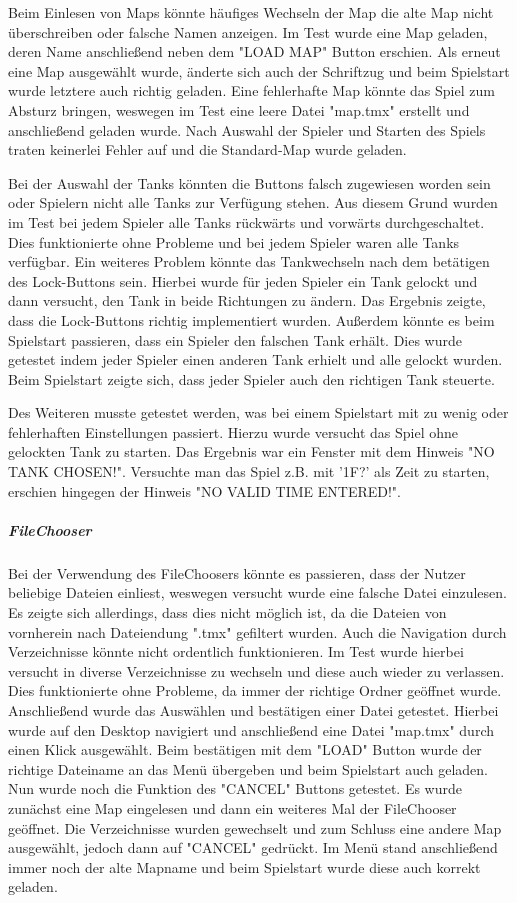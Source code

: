 \documentclass[a4paper]{scrreprt}
\begin{document}
Beim Einlesen von Maps könnte häufiges Wechseln der Map die alte Map nicht überschreiben oder falsche Namen anzeigen. Im Test wurde eine Map geladen, deren Name anschließend neben dem "LOAD MAP" Button erschien. Als erneut eine Map ausgewählt wurde, änderte sich auch der Schriftzug und beim Spielstart wurde letztere auch richtig geladen. Eine fehlerhafte Map könnte das Spiel zum Absturz bringen, weswegen im Test eine leere Datei "map.tmx" erstellt und anschließend geladen wurde. Nach Auswahl der Spieler und Starten des Spiels traten keinerlei Fehler auf und die Standard-Map wurde geladen.
		

Bei der Auswahl der Tanks könnten die Buttons falsch zugewiesen worden sein oder Spielern nicht alle Tanks zur Verfügung stehen. Aus diesem Grund wurden im Test bei jedem Spieler alle Tanks rückwärts und vorwärts durchgeschaltet. Dies funktionierte ohne Probleme und bei jedem Spieler waren alle Tanks verfügbar. Ein weiteres Problem könnte das Tankwechseln nach dem betätigen des Lock-Buttons sein. Hierbei wurde für jeden Spieler ein Tank gelockt und dann versucht, den Tank in beide Richtungen zu ändern. Das Ergebnis zeigte, dass die Lock-Buttons richtig implementiert wurden. Außerdem könnte es beim Spielstart passieren, dass ein Spieler den falschen Tank erhält. Dies wurde getestet indem jeder Spieler einen anderen Tank erhielt und alle gelockt wurden. Beim Spielstart zeigte sich, dass jeder Spieler auch den richtigen Tank steuerte.
		
Des Weiteren musste getestet werden, was bei einem Spielstart mit zu wenig oder fehlerhaften Einstellungen passiert. Hierzu wurde versucht das Spiel ohne gelockten Tank zu starten. Das Ergebnis war ein Fenster mit dem Hinweis "NO TANK CHOSEN!". Versuchte man das Spiel z.B. mit '1F?' als Zeit zu starten, erschien hingegen der Hinweis "NO VALID TIME ENTERED!". 

\subparagraph{FileChooser}
Bei der Verwendung des FileChoosers könnte es passieren, dass der Nutzer beliebige Dateien einliest, weswegen versucht wurde eine falsche Datei einzulesen. Es zeigte sich allerdings, dass dies nicht möglich ist, da die Dateien von vornherein nach Dateiendung ".tmx" gefiltert wurden. Auch die Navigation durch Verzeichnisse könnte nicht ordentlich funktionieren. Im Test wurde hierbei versucht in diverse Verzeichnisse zu wechseln und diese auch wieder zu verlassen. Dies funktionierte ohne Probleme, da immer der richtige Ordner geöffnet wurde. Anschließend wurde das Auswählen und bestätigen einer Datei getestet. Hierbei wurde auf den Desktop navigiert und anschließend eine Datei "map.tmx" durch einen Klick ausgewählt. Beim bestätigen mit dem "LOAD" Button wurde der richtige Dateiname an das Menü übergeben und beim Spielstart auch geladen. Nun wurde noch die Funktion des "CANCEL" Buttons getestet. Es wurde zunächst eine Map eingelesen und dann ein weiteres Mal der FileChooser geöffnet. Die Verzeichnisse wurden gewechselt und zum Schluss eine andere Map ausgewählt, jedoch dann auf "CANCEL" gedrückt. Im Menü stand anschließend immer noch der alte Mapname und beim Spielstart wurde diese auch korrekt geladen.
		
\end{document}

